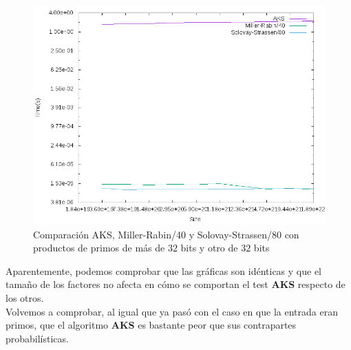 \begin{figure}[H]
	\centering
	\includegraphics[totalheight=12cm]{img/graphs/aks-probs-comps-32-mean}
	\caption{Comparación AKS, Miller-Rabin/40 y Solovay-Strassen/80 con productos de primos de más de $32$ bits y otro de $32$ bits}
\end{figure}

Aparentemente, podemos comprobar que las gráficas son idénticas y que el tamaño de los factores no afecta en cómo se comportan el test \textbf{AKS} respecto de los otros.\\

Volvemos a comprobar, al igual que ya pasó con el caso en que la entrada eran primos, que el algoritmo \textbf{AKS} es bastante peor que sus contrapartes probabilísticas.

\endinput
